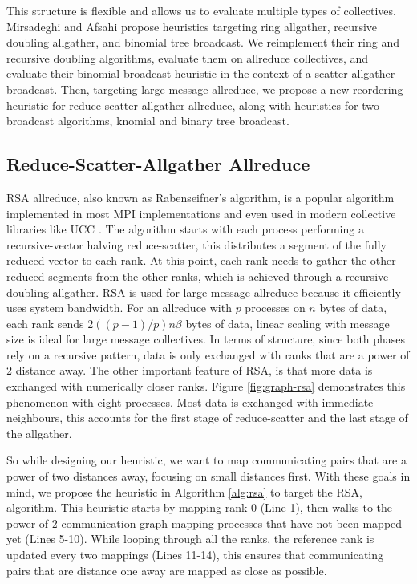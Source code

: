 This structure is flexible and allows us to evaluate multiple types of collectives.
Mirsadeghi and Afsahi \cite{Mirsadeghi2016TopoAwareCollRR} propose heuristics targeting ring allgather, recursive doubling allgather, and binomial tree broadcast. 
We reimplement their ring and recursive doubling algorithms, evaluate them on allreduce collectives, and evaluate their binomial-broadcast heuristic in the context of a scatter-allgather broadcast.
Then, targeting large message allreduce, we propose a new reordering heuristic for reduce-scatter-allgather allreduce, along with heuristics for two broadcast algorithms, knomial and binary tree broadcast.


\subsection{Reduce-Scatter-Allgather Allreduce}
\gls{RSA} allreduce, also known as Rabenseifner's algorithm, is a popular algorithm implemented in most \gls{MPI} implementations and even used in modern collective libraries like UCC \cite{Rabenseifner2004OptOfCollRedOps}.
The algorithm starts with each process performing a recursive-vector halving reduce-scatter, this distributes a segment of the fully reduced vector to each rank.
At this point, each rank needs to gather the other reduced segments from the other ranks, which is achieved through a recursive doubling allgather.
\gls{RSA} is used for large message allreduce because it efficiently uses system bandwidth.
For an allreduce with $p$ processes on $n$ bytes of data, each rank sends $2((p-1)/p)n\beta$ bytes of data, linear scaling with message size is ideal for large message collectives.
In terms of structure, since both phases rely on a recursive pattern, data is only exchanged with ranks that are a power of 2 distance away.
The other important feature of \gls{RSA}, is that more data is exchanged with numerically closer ranks.
Figure \ref{fig:graph-rsa} demonstrates this phenomenon with eight processes.
Most data is exchanged with immediate neighbours, this accounts for the first stage of reduce-scatter and the last stage of the allgather.



So while designing our heuristic, we want to map communicating pairs that are a power of two distances away, focusing on small distances first.
With these goals in mind, we propose the heuristic in Algorithm \ref{alg:rsa} to target the \gls{RSA}, algorithm.
This heuristic starts by mapping rank 0 (Line 1), then walks to the power of 2 communication graph mapping processes that have not been mapped yet (Lines 5-10). 
While looping through all the ranks, the reference rank is updated every two mappings (Lines 11-14), this ensures that communicating pairs that are distance one away are mapped as close as possible. 

